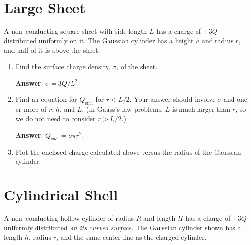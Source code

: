 \documentclass{article}
\begin{document}
\newpage

\section{Large Sheet}



A non--conducting square sheet with side length $L$ has a charge of $+3Q$ distributed uniformly on it. The Gaussian cylinder has a height $h$ and radius $r$, and half of it is above the sheet.

\begin{enumerate}

  \item Find the surface charge density, $\sigma$, of the sheet.

        \ifsolutions
        {\bf Answer}: $\sigma=3Q/L^2$
        \fi

        \ifsolutions\else
        \vskip 36pt
        \fi

  \item Find an equation for $Q_{\text{encl}}$ for $r<L/2$. Your answer should involve $\sigma$ and one or more of $r$, $h$, and $L$. (In Gauss's law problems, $L$ is much larger than $r$, so we do not need to consider $r > L/2$.)

        \ifsolutions
        {\bf Answer}: $Q_{\text{encl}}=\sigma \pi r^2$.
        \fi

        \ifsolutions\else
        \vskip 36pt
        \fi

  \item Plot the enclosed charge calculated above versus the radius of the Gaussian cylinder.

        \ifsolutions
        
        \fi

\end{enumerate}

\newpage

\section{Cylindrical Shell}

A non--conducting hollow cylinder of radius $R$ and length $H$ has a charge of $+3Q$ uniformly distributed \emph{on its curved surface}. The Gaussian cylinder shown has a length $h$, radius $r$, and the same center line as the charged cylinder.


\end{document}
